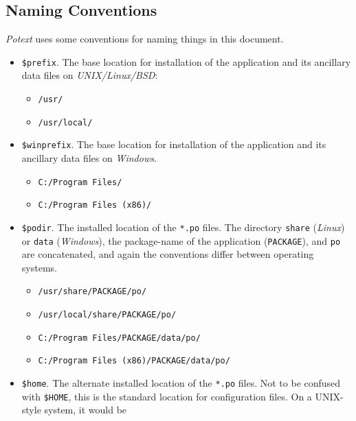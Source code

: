 \documentclass[
 11pt,
 twoside,
 a4paper,
 final                                 %
]{article}
\begin{document}
\subsection{Naming Conventions}
\label{subsec:introduction_conventions}

   \textsl{Potext} uses some conventions for naming things in this
   document.

   \begin{itemize}
      \item \texttt{\$prefix}. The base location for installation of
         the application and its ancillary data files on
         \textsl{UNIX/Linux/BSD}:
         \begin{itemize}
            \item \texttt{/usr/}
            \item \texttt{/usr/local/}
         \end{itemize}
      \item \texttt{\$winprefix}. The base location for installation of
         the application and its ancillary data files on \textsl{Windows}.
         \begin{itemize}
            \item \texttt{C:/Program Files/}
            \item \texttt{C:/Program Files (x86)/}
         \end{itemize}
      \item \texttt{\$podir}. The installed location of the \texttt{*.po}
         files.  The directory \texttt{share} (\textsl{Linux}) or
         \texttt{data} (\textsl{Windows}),
         the package-name of the application
         (\texttt{PACKAGE}), and \texttt{po} are concatenated,
         and again the conventions differ between operating systems.
         \begin{itemize}
            \item \texttt{/usr/share/PACKAGE/po/}
            \item \texttt{/usr/local/share/PACKAGE/po/}
            \item \texttt{C:/Program Files/PACKAGE/data/po/}
            \item \texttt{C:/Program Files (x86)/PACKAGE/data/po/}
         \end{itemize}
      \item \texttt{\$home}. The alternate installed
         location of the \texttt{*.po} files.
         Not to be confused with \texttt{\$HOME}, this is
         the standard location for configuration files.
         On a UNIX-style system, it would be \linebreak

\end{itemize}
\end{document}
